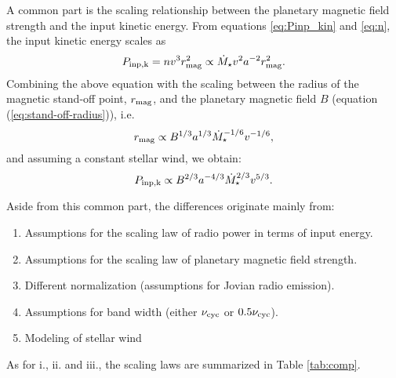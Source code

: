 \documentclass[iop,numberedappendix,apj]{emulateapj}
\begin{document}
A common part is the scaling relationship between the planetary magnetic field strength and the input kinetic energy.
From equations \ref{eq:Pinp_kin} and \ref{eq:n}, the input kinetic energy scales as
\begin{equation}
P_{\rm inp,k}=nv^3 r_{\rm mag}^2 \propto \dot M_{\star} v^2 a^{-2} r_{\rm mag}^2.
\end{equation}
Combining the above equation with the scaling between the radius of the magnetic stand-off point, $r_{\rm mag}$, and the planetary magnetic field $B$ (equation (\ref{eq:stand-off-radius})), i.e.\
\begin{equation}
r_{\rm mag} \propto B^{1/3} a^{1/3} \dot M_{\star }^{-1/6} v^{-1/6}, 
\end{equation}
and assuming a constant stellar wind, we obtain:
\begin{equation}
P_{\rm inp, k} \propto B^{2/3} a^{-4/3} \dot M_{\star }^{2/3} v^{5/3}.
\end{equation}


Aside from this common part, the differences originate mainly from:
\renewcommand{\theenumi}{\roman{enumi}}
\begin{enumerate}
\item Assumptions for the scaling law of radio power in terms of input energy. 
\item Assumptions for the scaling law of planetary magnetic field strength. 
\item Different normalization (assumptions for Jovian radio emission). 
\item Assumptions for band width (either $\nu_{\rm cyc}$ or $0.5\nu_{\rm cyc}$). 
\item Modeling of stellar wind
\end{enumerate}

As for i., ii. and iii., the scaling laws are summarized in Table \ref{tab:comp}. 
\end{document}
